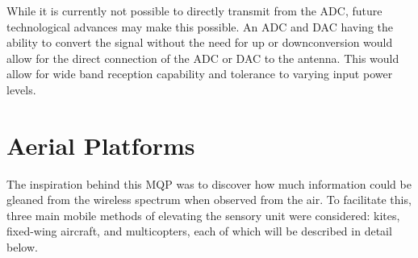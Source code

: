 While it is currently not possible to directly transmit from the ADC, future technological advances may make this possible. An ADC and DAC having the ability to convert the signal without the need for up or downconversion would allow for the direct connection of the ADC or DAC to the antenna. This would allow for wide band reception capability and tolerance to varying input power levels.\cite{soprano_sdr}

\section{Aerial Platforms}
The inspiration behind this MQP was to discover how much information could be gleaned from the wireless spectrum when observed from the air. To facilitate this, three main mobile methods of elevating the sensory unit were considered: kites, fixed-wing aircraft, and multicopters, each of which will be described in detail below.

